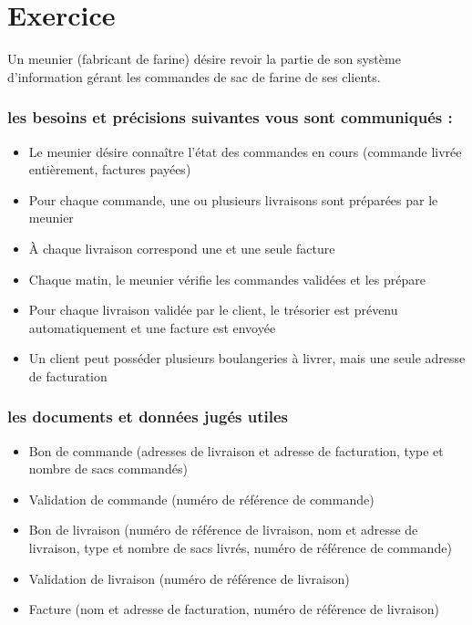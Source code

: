 \section*{Exercice}
Un meunier (fabricant de farine) désire revoir la partie de son système d'information gérant les commandes de sac de farine de ses clients.

\subsubsection*{les besoins et précisions suivantes vous sont communiqués :}
\begin{itemize}
    \item Le meunier désire connaître l'état des commandes en cours (commande livrée entièrement, factures payées)
    \item Pour chaque commande, une ou plusieurs livraisons sont préparées par le meunier
    \item À chaque livraison correspond une et une seule facture
    \item Chaque matin, le meunier vérifie les commandes validées et les prépare
    \item Pour chaque livraison validée par le client, le trésorier est prévenu automatiquement et une facture est envoyée
    \item Un client peut posséder plusieurs boulangeries à livrer, mais une seule adresse de facturation
\end{itemize}

\subsubsection*{les documents et données jugés utiles}
\begin{itemize}
    \item Bon de commande (adresses de livraison et adresse de facturation, type et nombre de sacs commandés)
    \item Validation de commande (numéro de référence de commande)
    \item Bon de livraison (numéro de référence de livraison, nom et adresse de livraison, type et nombre de sacs livrés, numéro de référence de commande)
    \item Validation de livraison (numéro de référence de livraison)
    \item Facture (nom et adresse de facturation, numéro de référence de livraison)
\end{itemize}


